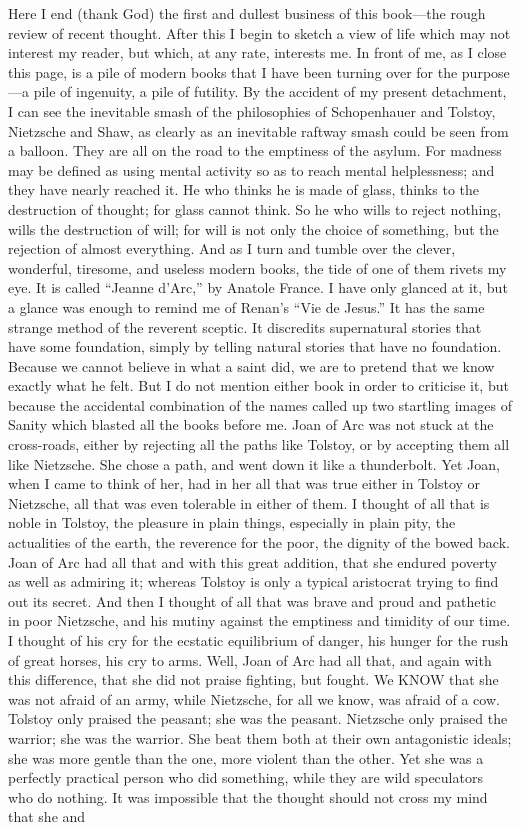 Here I end (thank God) the first and dullest business of this book—the rough review of recent thought. After this I begin to sketch a view of life which may not interest my reader, but which, at any rate, interests me. In front of me, as I close this page, is a pile of modern books that I have been turning over for the purpose—a pile of ingenuity, a pile of futility. By the accident of my present detachment, I can see the inevitable smash of the philosophies of Schopenhauer and Tolstoy, Nietzsche and Shaw, as clearly as an inevitable raftway smash could be seen from a balloon. They are all on the road to the emptiness of the asylum. For madness may be defined as using mental activity so as to reach mental helplessness; and they have nearly reached it. He who thinks he is made of glass, thinks to the destruction of thought; for glass cannot think. So he who wills to reject nothing, wills the destruction of will; for will is not only the choice of something, but the rejection of almost everything. And as I turn and tumble over the clever, wonderful, tiresome, and useless modern books, the tide of one of them rivets my eye. It is called “Jeanne d’Arc,” by Anatole France. I have only glanced at it, but a glance was enough to remind me of Renan’s “Vie de Jesus.” It has the same strange method of the reverent sceptic. It discredits supernatural stories that have some foundation, simply by telling natural stories that have no foundation. Because we cannot believe in what a saint did, we are to pretend that we know exactly what he felt. But I do not mention either book in order to criticise it, but because the accidental combination of the names called up two startling images of Sanity which blasted all the books before me. Joan of Arc was not stuck at the cross-roads, either by rejecting all the paths like Tolstoy, or by accepting them all like Nietzsche. She chose a path, and went down it like a thunderbolt. Yet Joan, when I came to think of her, had in her all that was true either in Tolstoy or Nietzsche, all that was even tolerable in either of them. I thought of all that is noble in Tolstoy, the pleasure in plain things, especially in plain pity, the actualities of the earth, the reverence for the poor, the dignity of the bowed back. Joan of Arc had all that and with this great addition, that she endured poverty as well as admiring it; whereas Tolstoy is only a typical aristocrat trying to find out its secret. And then I thought of all that was brave and proud and pathetic in poor Nietzsche, and his mutiny against the emptiness and timidity of our time. I thought of his cry for the ecstatic equilibrium of danger, his hunger for the rush of great horses, his cry to arms. Well, Joan of Arc had all that, and again with this difference, that she did not praise fighting, but fought. We KNOW that she was not afraid of an army, while Nietzsche, for all we know, was afraid of a cow. Tolstoy only praised the peasant; she was the peasant. Nietzsche only praised the warrior; she was the warrior. She beat them both at their own antagonistic ideals; she was more gentle than the one, more violent than the other. Yet she was a perfectly practical person who did something, while they are wild speculators who do nothing. It was impossible that the thought should not cross my mind that she and 